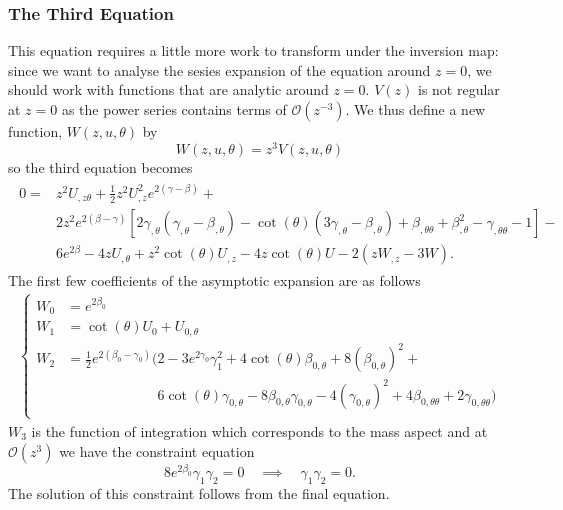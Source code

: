 \documentclass[a4paper,11pt]{article}
\numberwithin{equation}{section}
\begin{document}
\subsubsection{The Third Equation}
\noindent This equation requires a little more work to transform under the inversion map: since we want to analyse the sesies expansion of the equation around $z=0$, we should work with functions that are analytic around $z=0$. $V(z)$ is not regular at $z=0$ as the power series contains terms of $\mathcal{O}(z^{-3})$. We thus define a new function, $W(z,u,\theta)$ by
\begin{equation}
W(z,u,\theta)=z^3V(z,u,\theta) 
\end{equation}
so the third equation becomes
\begin{align}
\begin{split}
0=&z^2 U_{,z \theta}+\frac{1}{2} z^2  U_{,z}^2 e^{2 (\gamma -\beta)}+ \\
& 2 z^2 e^{2 (\beta-\gamma)} [2 \gamma_{,\theta} (\gamma_{,\theta}-\beta_{,\theta})- \cot (\theta ) (3 \gamma_{,\theta} - \beta_{,\theta} )+\beta_{,\theta \theta} +\beta_{,\theta}^2-\gamma_{, \theta \theta}-1]- \\
&6 e^{2 \beta}-4 z U_{,\theta}+z^2 \cot (\theta ) U_{,z}-4 z \cot (\theta ) U- 2 (z W_{,z}-3 W).
\end{split}
\end{align}
The first few coefficients of the asymptotic expansion are as follows 
\begin{align}
\begin{cases}
W_0& =  e^{2 \beta _{0}} \\
W_{1}& =\cot (\theta ) U_{0}+U_{0,\theta}\\ 
W_{2}&=\frac{1}{2}e^{2(\beta_{0}-\gamma_{0})}(2-3e^{2\gamma_0}\gamma_1^2+4\cot(\theta)\beta_{0,\theta}+8(\beta_{0,\theta})^2+ \\ 
& \phantom{\frac{1}{2}e^{2(\beta_{0}-\gamma_{0})}(=}6\cot(\theta)\gamma_{0,\theta}-8\beta_{0,\theta}\gamma_{0,\theta}-4(\gamma_{0,\theta})^2+4\beta_{0,\theta \theta}+2\gamma_{0,\theta \theta}) \\
 \end{cases}
\end{align}
$W_3$ is the function of integration which corresponds to the mass aspect and at $\mathcal{O}(z^3)$ we have the constraint equation
\begin{equation}
8e^{2\beta_0} \gamma_1 \gamma_2=0 \quad \implies \quad  \gamma_1 \gamma_2 =0.
\end{equation} 
The solution of this constraint follows from the final equation.
\end{document}
